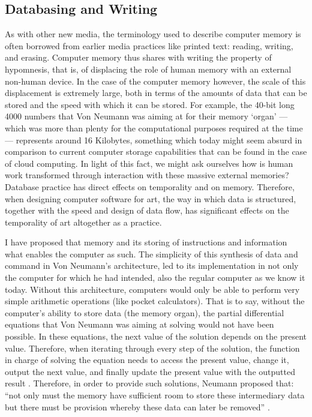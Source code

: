 \subsection{Databasing and Writing}

As with other new media, the terminology used to describe computer memory is often borrowed from earlier media practices like printed text: reading, writing, and erasing. Computer memory thus shares with writing the property of hypomnesis, that is, of displacing the role of human memory with an external non-human device. In the case of the computer memory however, the scale of this displacement is extremely large, both in terms of the amounts of data that can be stored and the speed with which it can be stored. For example, the 40-bit long 4000 numbers that Von Neumann was aiming at for their memory `organ' ---which was more than plenty for the computational purposes required at the time--- represents around 16 Kilobytes, something which today might seem absurd in comparison to current computer storage capabilities that can be found in the case of cloud computing. In light of this fact, we might ask ourselves how is human work transformed through interaction with these massive external memories? Database practice has direct effects on temporality and on memory. Therefore, when designing computer software for art, the way in which data is structured, together with the speed and design of data flow, has significant effects on the temporality of art altogether as a practice. 

I have proposed that memory and its storing of instructions and information what enables the computer as such. The simplicity of this synthesis of data and command in Von Neumann's architecture, led to its implementation in not only the computer for which he had intended, also the regular computer as we know it today. Without this architecture, computers would only be able to perform very simple arithmetic operations (like pocket calculators). That is to say, without the computer's ability to store data (the memory organ), the partial differential equations that Von Neumann was aiming at solving would not have been possible. In these equations, the next value of the solution depends on the present value. Therefore, when iterating through every step of the solution, the function in charge of solving the equation needs to access the present value, change it, output the next value, and finally update the present value with the outputted result . Therefore, in order to provide such solutions, Neumann proposed that: ``not only must the memory have sufficient room to store these intermediary data but there must be provision whereby these data can later be removed'' \parencite[3]{von46:Pre}.

